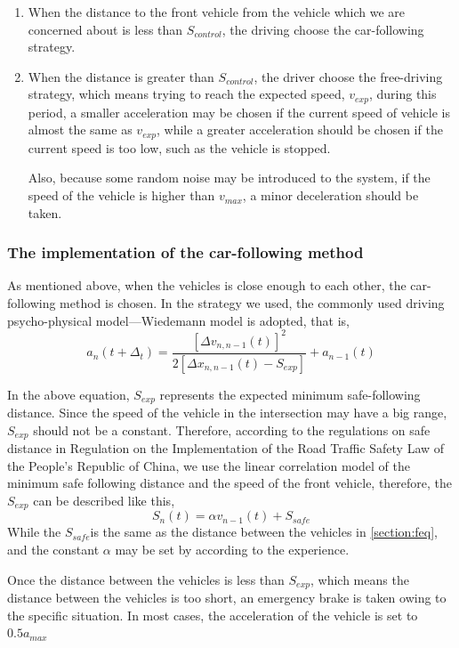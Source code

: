 \documentclass[a4paper]{paper}
\begin{document}
\begin{enumerate}
\item When the distance to the front vehicle from the vehicle which we are concerned about is less than $S_{control}$, the driving choose the car-following strategy.

\item When the distance is greater than $S_{control}$, the driver choose the free-driving strategy, which means trying to reach the expected speed, $v_{exp}$, during this period, a smaller acceleration may be chosen if the current speed of vehicle is almost the same as $v_{exp}$, while a greater acceleration should be chosen if the current speed is too low, such as the vehicle is stopped.

Also, because some random noise may be introduced to the system, if the speed of the vehicle is higher than $v_{max}$, a minor deceleration should be taken.
\end{enumerate}
\subsubsection{The implementation of the car-following method}
\label{cf}

As mentioned above, when the vehicles is close enough to each other, the car-following method is chosen. In the strategy we used, the commonly used driving psycho-physical model—Wiedemann model is adopted, that is,
$$a_n(t+\Delta_t)=\frac{[\Delta v_{n,n-1}(t)]^2}{2[\Delta x_{n,n-1}(t)-S_{exp}]}+a_{n-1}(t)$$

In the above equation, $S_{exp}$ represents the expected minimum safe-following distance. Since the speed of the vehicle in the intersection may have a big range, $S_{exp}$ should not be a constant. Therefore, according to the regulations on safe distance in Regulation on the Implementation of the Road Traffic Safety Law of the People's Republic of China, we use the linear correlation model of the minimum safe following distance and the speed of the front vehicle, therefore, the $S_{exp}$ can be described like this,
$$S_n(t)=\alpha v_{n-1}(t)+S_{safe}$$
While the $S_{safe}$is the same as the distance between the vehicles in \ref{section:feq}, and the constant $\alpha$ may be set by according to the experience.

Once the distance between the vehicles is less than $S_{exp}$, which means the distance between the vehicles is too short, an emergency brake is taken owing to the specific situation. In most cases, the acceleration of the vehicle is set to $0.5a_{max}$
\end{document}
